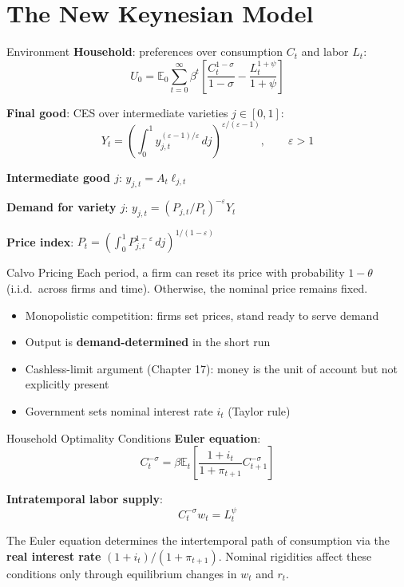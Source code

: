 \documentclass[blue]{beamer}
\newcommand{\E}{\mathbb{E}}
\begin{document}
\section{The New Keynesian Model}

\begin{frame}{Environment}
\textbf{Household}: preferences over consumption $C_t$ and labor $L_t$:
\[
U_0 = \E_0 \sum_{t=0}^{\infty} \beta^t \left[\frac{C_t^{1-\sigma}}{1-\sigma} - \frac{L_t^{1+\psi}}{1+\psi}\right]
\]

\textbf{Final good}: CES over intermediate varieties $j \in [0,1]$:
\[
Y_t = \left(\int_0^1 y_{j,t}^{(\varepsilon-1)/\varepsilon} \, dj\right)^{\varepsilon/(\varepsilon-1)}, \qquad \varepsilon > 1
\]

\textbf{Intermediate good $j$}: $y_{j,t} = A_t \ell_{j,t}$

\textbf{Demand for variety $j$}: $y_{j,t} = (P_{j,t}/P_t)^{-\varepsilon} Y_t$

\textbf{Price index}: $P_t = \left(\int_0^1 P_{j,t}^{1-\varepsilon} \, dj\right)^{1/(1-\varepsilon)}$
\end{frame}

\begin{frame}{Calvo Pricing}
Each period, a firm can reset its price with probability $1-\theta$ (i.i.d.\ across firms and time). Otherwise, the nominal price remains fixed.

\bigskip
\begin{itemize}
    \item Monopolistic competition: firms set prices, stand ready to serve demand
    \item Output is \textbf{demand-determined} in the short run
    \item Cashless-limit argument (Chapter 17): money is the unit of account but not explicitly present
    \item Government sets nominal interest rate $i_t$ (Taylor rule)
\end{itemize}
\end{frame}

\begin{frame}{Household Optimality Conditions}
\textbf{Euler equation}:
\[
C_t^{-\sigma} = \beta \E_t\left[\frac{1+i_t}{1+\pi_{t+1}} C_{t+1}^{-\sigma}\right]
\]

\textbf{Intratemporal labor supply}:
\[
C_t^{-\sigma} w_t = L_t^{\psi}
\]

The Euler equation determines the intertemporal path of consumption via the \textbf{real interest rate} $(1+i_t)/(1+\pi_{t+1})$. Nominal rigidities affect these conditions only through equilibrium changes in $w_t$ and $r_t$.
\end{frame}
\end{document}
